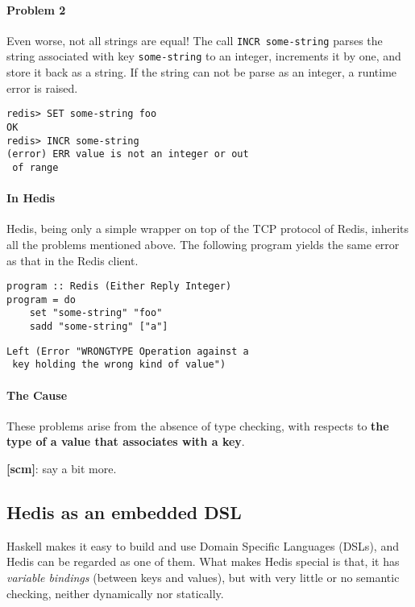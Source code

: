 \documentclass[pldi]{sigplanconf-pldi16}
\newcommand{\todo}[2]{{\bf [#1]}: #2}
\begin{document}
\paragraph{Problem 2} Even worse, not all strings are equal!
The call \texttt{INCR some-string} parses the string
associated with key \texttt{some-string}
to an integer, increments it by one, and store it back as a string.
If the string can not be parse as an integer, a runtime error
is raised.

\begin{verbatim}
redis> SET some-string foo
OK
redis> INCR some-string
(error) ERR value is not an integer or out
 of range
\end{verbatim}

\paragraph{In Hedis} Hedis, being only a simple wrapper on top
of the TCP protocol of Redis, inherits all the problems mentioned
above. The following program yields the same error as that in
the Redis client.

\begin{verbatim}
program :: Redis (Either Reply Integer)
program = do
    set "some-string" "foo"
    sadd "some-string" ["a"]
\end{verbatim}
\begin{verbatim}
Left (Error "WRONGTYPE Operation against a
 key holding the wrong kind of value")
\end{verbatim}

\paragraph{The Cause} These problems arise from the absence of type checking,
 with respects to \textbf{the type of a value that associates with a key}.

\todo{scm}{say a bit more.}

\subsection{Hedis as an embedded DSL}

Haskell makes it easy to build and use Domain Specific Languages (DSLs),
 and Hedis can be regarded as one of them. What makes Hedis special is that,
 it has \emph{variable bindings} (between keys and values), but with very
 little or no semantic checking, neither dynamically nor statically.
\end{document}
